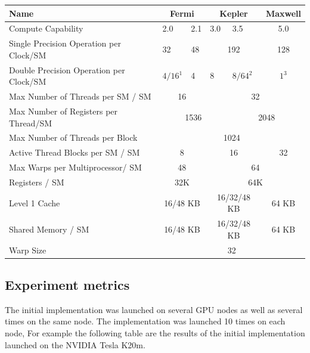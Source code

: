 \begin{table}[h]
\centering
  \begin{tabular} { | l | l  | l | l | l  |  l  | l |}
    \hline
    Name & \multicolumn{2}{|c|}{Fermi} & \multicolumn{2}{|c|}{Kepler} &  \multicolumn{2}{|c|}{Maxwell} \\
    \hline
    Compute Capability & 2.0 & 2.1 & 3.0 & 3.5 & \multicolumn{2}{|c|}{5.0}\\
   \hline
    Single Precision Operation per Clock/SM & 32 & 48 & \multicolumn{2}{|c|}{192} & \multicolumn{2}{|c|}{128}\\
   \hline
    Double Precision Operation per Clock/SM & $4/16^1$ & 4 & 8 & $8/64^2$ & \multicolumn{2}{|c|}{$1^3$}\\
   \hline
    Max Number of Threads per SM / SM & \multicolumn{2}{|c|}{16} & \multicolumn{4}{|c|}{32}\\
   \hline
    Max Number of Registers per Thread/SM & \multicolumn{3}{|c|}{1536} & \multicolumn{3}{|c|}{2048}\\
   \hline
       Max Number of Threads per Block & \multicolumn{6}{|c|}{1024}\\
   \hline
   Active Thread Blocks per SM / SM & \multicolumn{2}{|c|}{8} & \multicolumn{2}{|c|}{16} & \multicolumn{2}{|c|}{32}\\
   \hline
   Max Warps per Multiprocessor/ SM & \multicolumn{2}{|c|}{48} & \multicolumn{4}{|c|}{64}\\
   \hline
   Registers / SM & \multicolumn{2}{|c|}{32K} & \multicolumn{4}{|c|}{64K}\\
   \hline
   Level 1 Cache & \multicolumn{2}{|c|}{16/48 KB} & \multicolumn{2}{|c|}{16/32/48 KB} & \multicolumn{2}{|c|}{64 KB}\\
   \hline
   Shared Memory / SM & \multicolumn{2}{|c|}{16/48 KB} & \multicolumn{2}{|c|}{16/32/48 KB} & \multicolumn{2}{|c|}{64 KB}\\
   \hline
   Warp Size & \multicolumn{6}{c|}{32}  \\
   \hline
  \end{tabular}
  \end{table}
  
\subsection{Experiment metrics}

The initial implementation was launched on several GPU nodes as well as several times on the same node. The implementation was launched 10 times on each node, For example the following table are the results of the initial implementation launched on the NVIDIA Tesla K20m.

